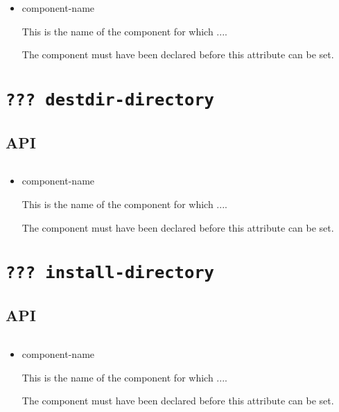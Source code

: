 \begin{verbatim}

\end{verbatim}

\begin{itemize}
\item component-name

  This is the name of the component for which ....

  The component must have been declared before this attribute can be
  set.

\end{itemize}

\section{\texttt{??? destdir-directory}}\label{api:destdir-directory}

\subsection{API}

\begin{verbatim}

\end{verbatim}

\begin{itemize}
\item component-name

  This is the name of the component for which ....

  The component must have been declared before this attribute can be
  set.

\end{itemize}

\section{\texttt{??? install-directory}}\label{api:install-directory}

\subsection{API}

\begin{verbatim}

\end{verbatim}

\begin{itemize}
\item component-name

  This is the name of the component for which ....

  The component must have been declared before this attribute can be
  set.

\end{itemize}

